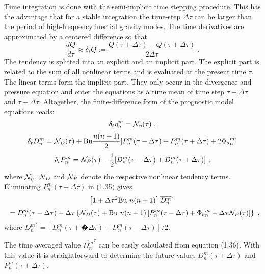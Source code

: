 Time integration is done with the  semi-implicit time stepping procedure. This has the advantage that for a stable integration 
the time-step $\Delta \tau$ can be larger than the period of high-frequency inertial gravity modes. 
The time derivatives are approximated by a centered difference so that 
\begin{equation}
\frac {d Q} {d \tau} \approx \delta_t Q := \frac {Q(\tau+\Delta \tau) - Q(\tau+\Delta \tau)} {2 \Delta \tau}~.
\end{equation}
The tendency is splitted into an explicit and an implicit part. The explicit part is related to the sum of all nonlinear terms
and is evaluated at the present time  $\tau$. The linear terms form the implicit part. They only occur in the divergence and pressure
equation and enter the equations as a time mean of time step $\tau +\Delta \tau$ and $\tau - \Delta \tau$. Altogether, the finite-difference form of the prognostic model equations reads:
{\setlength{\mathindent}{1em}
\begin{equation}
\delta_t \eta_n^m = 
{\cal N}_{\eta}(\tau)~,
\end{equation}
\begin{equation}
\delta_t D_n^m  = {\cal N}_{D}(\tau) 
+ {\rm Bu}\frac {n(n+1)} {2} [P_n^m(\tau-\Delta \tau) + P_n^m(\tau+\Delta \tau)
+ 2 {\Phi_s}^m_n]
\end{equation}
\begin{equation}
\delta_t P_n^m =  {\cal N}_{P}(\tau) 
- \frac 1 2 [D_n^m(\tau-\Delta \tau) + D_n^m(\tau+\Delta \tau)]~,
\end{equation}
where ${\cal N}_{\eta}$, ${\cal N}_{D}$ and  ${\cal N}_{P}$ denote the
respective nonlinear tendency terms. Eliminating $P_n^m(\tau+\Delta \tau)$ in (1.35) gives
\begin{equation}
\left [1 + \Delta \tau^2 {\rm Bu}~{n(n+1)}  \right ] \overline{D_n^m}^{\tau} 
\end{equation}
\[ \hspace{0.1in}
= 
 D_n^m(\tau - \Delta \tau) 
+  \Delta \tau \left \{ {\cal N}_{D}(\tau) 
+ {\rm Bu}~{n(n+1)}   \left [ 
P_n^m(\tau - \Delta \tau) + {\Phi_s}^m_n + \Delta \tau {\cal N}_P(\tau) \right ] \right \}~,
\]
}
where $\overline{D_n^m}^{\tau}= [D_n^m(\tau +� \Delta \tau)+D_n^m(\tau - \Delta \tau)]/2$.

The time averaged value $\overline{D_n^m}^{\tau}$ can be easily calculated from equation (1.36).
With this value it is straightforward to determine the future values $D^m_n(\tau + \Delta \tau)$
and $P^m_n(\tau + \Delta \tau)$.

